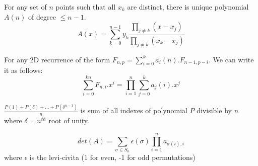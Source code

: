 

 For any set of $n$ points such that all $x_{k}$ are distinct, there is unique polynomial $A(n)$ of degree $\le n - 1$. $$A(x) = \sum_{k=0}^{n-1} y_{k} \frac{\prod_{j\neq k}(x-x_{j})}{\prod_{j\neq k}(x_{k}-x_{j})}$$
 
 For any 2D recurrence of the form $F_{n,p} = \sum_{i=0}^{k}a_{i}(n).F_{n-1,p-i}$. We can write it as follows:
$$\sum_{i=0}^{kn}F_{n,i}.x^{i} = \prod_{i=1}^{n} \sum_{j=0}^{k}a_{j}(i).x^{j}$$

 $\frac{P(1)+P(\delta)+...+P(\delta^{n-1})}{n}$ is sum of all indexes of polynomial $P$ divisible by $n$ where $\delta = n^{th}$ root of unity.

 $$det(A) = \sum_{\sigma \in S_{n}} \epsilon(\sigma) \prod_{i=1}^{n}a_{\sigma(i),i}$$ where $\epsilon$ is the levi-civita (1 for even, -1 for odd permutations)
